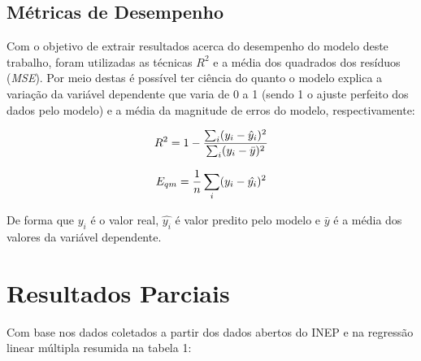 \documentclass[english, spanish, brazilian]{RBIEarticle} %
\begin{document}
\subsection{Métricas de Desempenho}
Com o objetivo de extrair resultados acerca do desempenho do modelo deste trabalho, foram utilizadas as técnicas $R^2$ e a média dos quadrados dos resíduos (\textit{MSE}). Por meio destas é possível ter ciência do quanto o modelo explica a variação da variável dependente que varia de 0 a 1 (sendo 1 o ajuste perfeito dos dados pelo modelo) e a média da magnitude de erros do modelo, respectivamente:

\vspace{0.5cm}
\begin{equation}
\large R^2 = 1 - \frac{\sum_i(y_i-\hat{y}_i)^2}{\sum_i(y_i-\bar{y})^2}
\end{equation}
\vspace{0.5cm}

\vspace{0.5cm}
\begin{equation}
\large E_{qm} = \frac{1}{n} \sum_i(y_i-\hat{y_i})^2
\end{equation}
\vspace{0.5cm}

De forma que $y_i$ é o valor real, $\hat{y_i}$ é valor predito pelo modelo e $\bar{y}$ é a média dos valores da variável dependente.

\section{Resultados Parciais}

Com base nos dados coletados a partir dos dados abertos do INEP e na regressão linear múltipla resumida na tabela 1:
\end{document}
